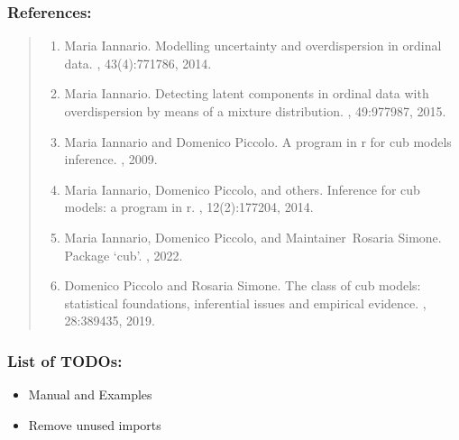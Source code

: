 \documentclass[letterpaper,10pt,english]{sphinxmanual}
\begin{document}
\subsubsection{References:}
\label{\detokenize{cubmods:id249}}\begin{quote}
\begin{enumerate}
%
\setcounter{enumi}{0}
\item {} 
\sphinxAtStartPar
Maria Iannario. Modelling uncertainty and overdispersion in ordinal data. , 43(4):771\textendash{}786, 2014.

\item {} 
\sphinxAtStartPar
Maria Iannario. Detecting latent components in ordinal data with overdispersion by means of a mixture distribution. , 49:977\textendash{}987, 2015.

\item {} 
\sphinxAtStartPar
Maria Iannario and Domenico Piccolo. A program in r for cub models inference. , 2009.

\item {} 
\sphinxAtStartPar
Maria Iannario, Domenico Piccolo, and others. Inference for cub models: a program in r. , 12(2):177\textendash{}204, 2014.

\item {} 
\sphinxAtStartPar
Maria Iannario, Domenico Piccolo, and Maintainer Rosaria Simone. Package ‘cub’. , 2022.

\item {} 
\sphinxAtStartPar
Domenico Piccolo and Rosaria Simone. The class of cub models: statistical foundations, inferential issues and empirical evidence. , 28:389\textendash{}435, 2019.

\end{enumerate}
\end{quote}


\subsubsection{List of TODOs:}
\label{\detokenize{cubmods:id287}}\begin{itemize}
\item {} 
\sphinxAtStartPar
Manual and Examples

\item {} 
\sphinxAtStartPar
Remove unused imports

\end{itemize}
\end{document}
